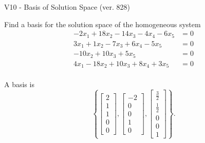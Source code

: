 \begin{exercise}
  \begin{exerciseTitle}V10 - Basis of Solution Space (ver. 828)\end{exerciseTitle}
  \begin{exerciseStatement}
    Find a basis for the solution space of the homogeneous system 
\begin{align*}
 -2 x_ 1 + 18 x_ 2 -14 x_ 3 -4 x_ 4 -6 x_ 5 &= 0  \\ 
  3 x_ 1 + 1 x_ 2 -7 x_ 3 + 6 x_ 4 -5 x_ 5 &= 0  \\ 
  -10 x_ 2 + 10 x_ 3 + 5 x_ 5 &= 0  \\ 
  4 x_ 1 -18 x_ 2 + 10 x_ 3 + 8 x_ 4 + 3 x_ 5 &= 0  \\ 
 \end{align*}


 
  \end{exerciseStatement}

  \begin{exerciseAnswer}
   A basis is   
\[\left\{\left[\begin{array}{c}
2 \\
1 \\
1 \\
0 \\
0
\end{array}\right] , \left[\begin{array}{c}
-2 \\
0 \\
0 \\
1 \\
0
\end{array}\right] , \left[\begin{array}{c}
\frac{3}{2} \\
\frac{1}{2} \\
0 \\
0 \\
1
\end{array}\right]\right\}.\]

  


  \end{exerciseAnswer}
\end{exercise}